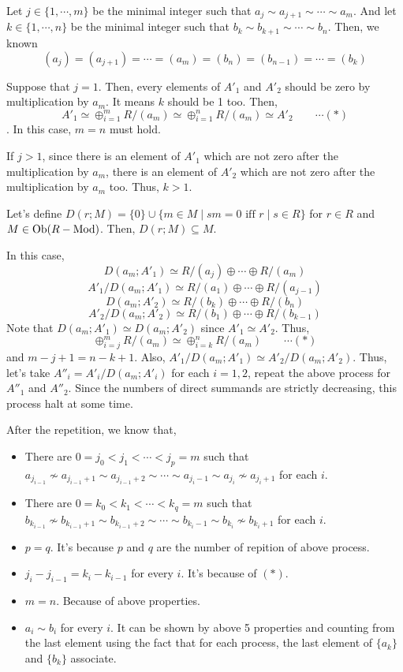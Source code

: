 Let \(j \in \{1, \cdots, m\}\) be the minimal integer
such that \(a_{j} \sim a_{j + 1} \sim \cdots \sim a_m\).
And let \(k \in \{1, \cdots, n\}\) be the minimal integer
such that \(b_{k} \sim b_{k + 1} \sim \cdots \sim b_n\).
Then, we known
\[(a_j) = (a_{j + 1}) = \cdots = (a_m) = (b_n) = (b_{n-1}) = \cdots = (b_k)\]

Suppose that \(j = 1\).
Then, every elements of \(A'_1\) and \(A'_2\) should be zero by multiplication by \(a_m\).
It means \(k\) should be 1 too.
Then,
\[A'_1 \simeq \oplus_{i=1}^m R/(a_m) \simeq \oplus_{i=1}^n R/(a_m) \simeq A'_2 \qquad\cdots(*)\].
In this case, \(m = n\) must hold.

If \(j > 1\),
since there is an element of \(A'_1\) which are not zero after the multiplication by \(a_m\),
there is an element of \(A'_2\) which are not zero after the multiplication by \(a_m\) too.
Thus, \(k > 1\).

Let's define \(D(r; M) = \{0\} \cup \{m \in M \mid sm = 0 \text{ iff } r \mid s \in R\}\) for \(r \in R\) and \(M \in \textnormal{Ob}(R-\textnormal{Mod})\).
Then, \(D(r; M) \subseteq M\).

In this case,
\[D(a_m; A'_1) \simeq R/(a_j) \oplus \cdots \oplus R/(a_m)\]
\[A'_1 / D(a_m; A'_1) \simeq R/(a_1) \oplus \cdots \oplus R/(a_{j-1})\]
\[D(a_m; A'_2) \simeq R/(b_k) \oplus \cdots \oplus R/(b_n)\]
\[A'_2 / D(a_m; A'_2) \simeq R/(b_1) \oplus \cdots \oplus R/(b_{k-1})\]
Note that \(D(a_m; A'_1) \simeq D(a_m; A'_2)\) since \(A'_1 \simeq A'_2\).
Thus,
\[\oplus_{i=j}^m R/(a_m) \simeq \oplus_{i=k}^n R/(a_m) \qquad\cdots(*)\]
and \(m - j + 1 = n - k + 1\).
Also, \(A'_1 / D(a_m; A'_1) \simeq A'_2 / D(a_m; A'_2)\).
Thus, let's take \(A''_i = A'_i / D(a_m; A'_i)\) for each \(i = 1, 2\),
repeat the above process for \(A''_1\) and \(A''_2\).
Since the numbers of direct summands are strictly decreasing,
this process halt at some time.

After the repetition,
we know that,
\begin{itemize}
\item There are \(0 = j_0 < j_1 < \cdots < j_p = m\)
  such that \(a_{j_{i-1}} \not\sim a_{j_{i-1} + 1} \sim a_{j_{i-1} + 2} \sim \cdots \sim a_{j_i-1} \sim a_{j_i} \not\sim a_{j_i + 1}\)
  for each \(i\).
\item There are \(0 = k_0 < k_1 < \cdots < k_q = m\)
  such that \(b_{k_{i-1}} \not\sim b_{k_{i-1} + 1} \sim b_{k_{i-1} + 2} \sim \cdots \sim b_{k_i-1} \sim b_{k_i} \not\sim b_{k_i + 1}\)
  for each \(i\).
\item \(p = q\). It's because \(p\) and \(q\) are the number of repition of above process.
\item \(j_i - j_{i - 1} = k_i - k_{i - 1}\)  for every \(i\). It's because of \((*)\).
\item \(m = n\). Because of above properties.
\item \(a_i \sim b_i\) for every \(i\). It can be shown by above 5 properties and counting from the last element using the fact that for each process, the last element of \(\{a_k\}\) and \(\{b_k\}\) associate.
\end{itemize}

